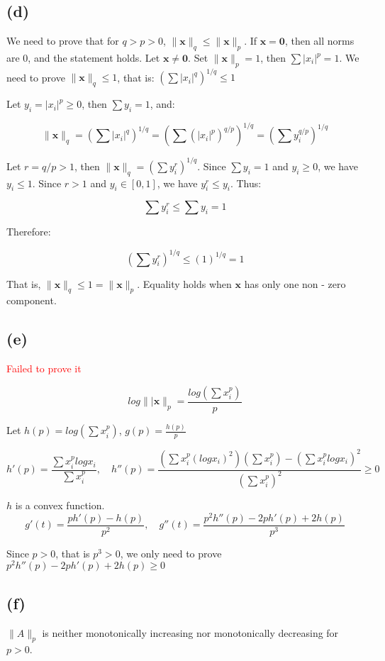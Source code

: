 \documentclass{article}
\begin{document}
\subsection*{(d)} 
We need to prove that for $ q > p > 0 $, $ \|\mathbf{x}\|_q \leq \|\mathbf{x}\|_p $. If $ \mathbf{x} = \mathbf{0} $, then all norms are 0, and the statement holds. Let $ \mathbf{x} \neq \mathbf{0} $. Set $ \|\mathbf{x}\|_p = 1 $, then $ \sum |x_i|^p = 1 $. We need to prove $ \|\mathbf{x}\|_q \leq 1 $, that is: $\left( \sum |x_i|^q \right)^{1/q} \leq 1$

Let $ y_i = |x_i|^p \geq 0 $, then $ \sum y_i = 1 $, and:

$$
\|\mathbf{x}\|_q = \left( \sum |x_i|^q \right)^{1/q} = \left( \sum (|x_i|^p)^{q/p} \right)^{1/q} = \left( \sum y_i^{q/p} \right)^{1/q}
$$

Let $ r = q/p > 1 $, then $ \|\mathbf{x}\|_q = \left( \sum y_i^r \right)^{1/q} $. Since $ \sum y_i = 1 $ and $ y_i \geq 0 $, we have $ y_i \leq 1 $. Since $ r > 1 $ and $ y_i \in [0, 1] $, we have $ y_i^r \leq y_i $. Thus:

$$
\sum y_i^r \leq \sum y_i = 1
$$

Therefore:

$$
\left( \sum y_i^r \right)^{1/q} \leq (1)^{1/q} = 1
$$

That is, $ \|\mathbf{x}\|_q \leq 1 = \|\mathbf{x}\|_p $. Equality holds when $ \mathbf{x} $ has only one non - zero component.

\subsection*{(e)} 
\textcolor{red}{Failed to prove it}

$$
log\||\mathbf{x}\|_p=\frac{log(\sum x_i^p)}{p}
$$

Let $h(p)= log(\sum x_i^p) $, $g(p)=\frac{h(p)}{p}$

$$
h'(p)=\frac{\sum x_i^plogx_i}{\sum x_i^p}, \quad h''(p)= \frac{(\sum x_i^p(logx_i)^2)(\sum x_i^p)-(\sum x_i^plogx_i)^2}{(\sum x_i^p)^2} \geq 0
$$

$h$ is a convex function.
$$
g'(t)=\frac{ph'(p)-h(p)}{p^2}, \quad g''(t)=\frac{p^2 h''(p)-2ph'(p)+2h(p)}{p^3}
$$

Since $p>0$, that is $p^3>0$, we only need to prove $p^2 h''(p)-2ph'(p)+2h(p) \geq 0$

\subsection*{(f)} 
$\|A\|_p$ is neither monotonically increasing nor monotonically decreasing for $p>0$.
\end{document}
